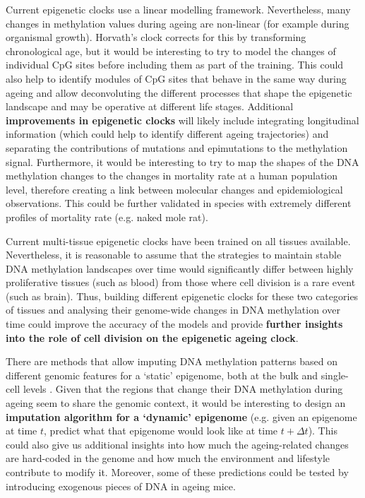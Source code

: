 \bigskip

Current epigenetic clocks use a linear modelling framework. Nevertheless, many changes in methylation values during ageing are non-linear (for example during organismal growth). Horvath's clock corrects for this by transforming chronological age, but it would be interesting to try to model the changes of individual CpG sites before including them as part of the training. This could also help to identify modules of CpG sites that behave in the same way during ageing and allow deconvoluting the different processes that shape the epigenetic landscape and may be operative at different life stages. Additional \textbf{improvements in epigenetic clocks} will likely include integrating longitudinal information (which could help to identify different ageing trajectories) \cite{Jensen2014} and separating the contributions of mutations and epimutations to the methylation signal. Furthermore, it would be interesting to try to map the shapes of the DNA methylation changes to the changes in mortality rate at a human population level, therefore creating a link between molecular changes and epidemiological observations. This could be further validated in species with extremely different profiles of mortality rate (e.g. naked mole rat).

\bigskip

Current multi-tissue epigenetic clocks have been trained on all tissues available. Nevertheless, it is reasonable to assume that the strategies to maintain stable DNA methylation landscapes over time would significantly differ between highly proliferative tissues (such as blood) from those where cell division is a rare event (such as brain). Thus, building different epigenetic clocks for these two categories of tissues and analysing their genome-wide changes in DNA methylation over time could improve the accuracy of the models and provide \textbf{further insights into the role of cell division on the epigenetic ageing clock}.

\bigskip

There are methods that allow imputing DNA methylation patterns based on different genomic features for a `static' epigenome, both at the bulk \cite{Zhang2015} and single-cell levels \cite{Angermueller2017,Kapourani2019}. Given that the regions that change their DNA methylation during ageing seem to share the genomic context, it would be interesting to design an \textbf{imputation algorithm for a `dynamic' epigenome} (e.g. given an epigenome at time $t$, predict what that epigenome would look like at time $t + \Delta t$). This could also give us additional insights into how much the ageing-related changes are hard-coded in the genome and how much the environment and lifestyle contribute to modify it. Moreover, some of these predictions could be tested by introducing exogenous pieces of DNA in ageing mice.

